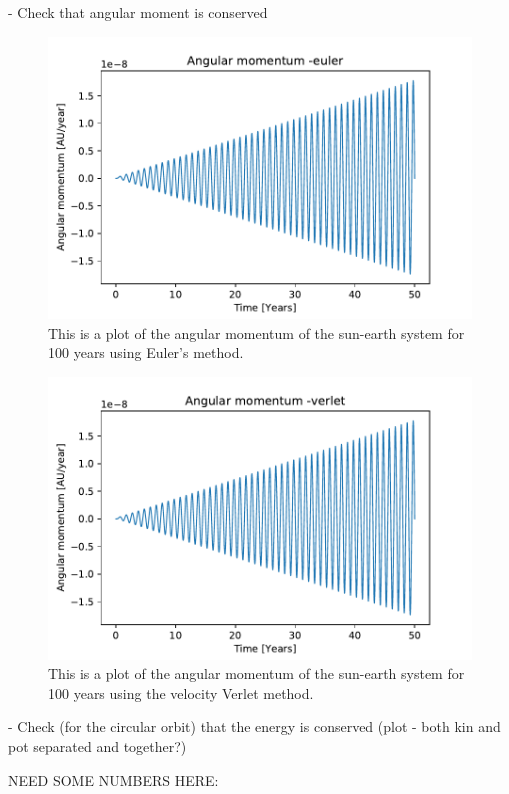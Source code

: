 	- Check that angular moment is conserved
\begin{figure}[H]
\includegraphics[width=1.1\linewidth]{../results/plots/angularmomentum-euler.pdf}\caption{This is a plot of the angular momentum of the sun-earth system for 100 years using Euler's method.}\label{fig:angluarmomentum-euler}
\end{figure}	

\begin{figure}[H]
\includegraphics[width=1.1\linewidth]{../results/plots/angularmomentum-verlet.pdf}\caption{This is a plot of the angular momentum of the sun-earth system for 100 years using the velocity Verlet method.}\label{fig:angularmomentum-verlet}
\end{figure}	
	- Check (for the circular orbit) that the energy is conserved (plot - both kin and pot separated and together?)

NEED SOME NUMBERS HERE:

